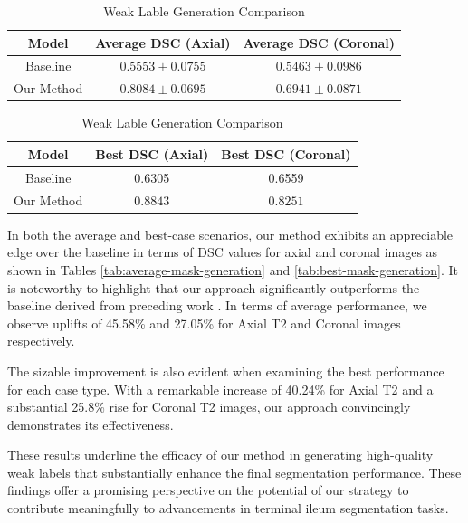 \begin{table}[ht]
    \begin{subtable}[b]{\textwidth}
        \centering
        \begin{tabular}{c | c | c}
        Model & Average DSC (Axial) & Average DSC (Coronal) \\
        \hline
        Baseline & \(0.5553 \pm 0.0755\)  & \(0.5463 \pm 0.0986\)\\
        \hline
        Our Method & \(\mathbf{0.8084 \pm 0.0695}\) & \(\mathbf{0.6941 \pm 0.0871}\) 
       \end{tabular}
       \caption{Average Case Comparison}
       \label{tab:average-mask-generation}
    \end{subtable}
    \vfill
    \begin{subtable}[b]{\textwidth}
        \centering
        \begin{tabular}{c | c | c}
        Model & Best DSC (Axial) & Best DSC (Coronal) \\
        \hline
        Baseline & 0.6305 & 0.6559\\
        \hline
        Our Method & \(\mathbf{0.8843}\) & \(\mathbf{0.8251}\)
       \end{tabular}
       \caption{Best Case Comparison}
       \label{tab:best-mask-generation}
    \end{subtable}
     \caption{Weak Lable Generation Comparison}
     \label{tab:mask-generation-comparison}
\end{table}

In both the average and best-case scenarios, our method exhibits an appreciable edge over the baseline in terms of DSC values for axial and coronal images as shown in Tables \ref{tab:average-mask-generation} and \ref{tab:best-mask-generation}. It is noteworthy to highlight that our approach significantly outperforms the baseline derived from preceding work \cite{Ali2022}. In terms of average performance, we observe uplifts of 45.58\% and 27.05\% for Axial T2 and Coronal images respectively.

The sizable improvement is also evident when examining the best performance for each case type. With a remarkable increase of 40.24\% for Axial T2 and a substantial 25.8\% rise for Coronal T2 images, our approach convincingly demonstrates its effectiveness.

These results underline the efficacy of our method in generating high-quality weak labels that substantially enhance the final segmentation performance. These findings offer a promising perspective on the potential of our strategy to contribute meaningfully to advancements in terminal ileum segmentation tasks.

